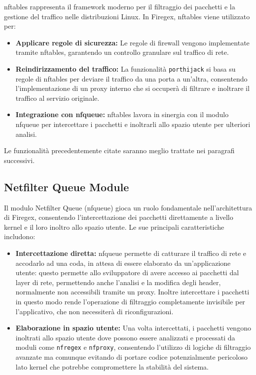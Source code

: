 nftables rappresenta il framework moderno per il filtraggio dei pacchetti e la gestione del traffico nelle distribuzioni Linux. In Firegex, nftables viene utilizzato per:
\begin{itemize}
    \item \textbf{Applicare regole di sicurezza:} Le regole di firewall vengono implementate tramite nftables, garantendo un controllo granulare sul traffico di rete.
    \item \textbf{Reindirizzamento del traffico:} La funzionalità \texttt{porthijack} si basa su regole di nftables per deviare il traffico da una porta a un’altra, consentendo l’implementazione di un proxy interno che si occuperà di filtrare e inoltrare il traffico al servizio originale.
    \item \textbf{Integrazione con nfqueue:} nftables lavora in sinergia con il modulo nfqueue per intercettare i pacchetti e inoltrarli allo spazio utente per ulteriori analisi.
\end{itemize}

Le funzionalità precedentemente citate saranno meglio trattate nei paragrafi successivi.

\subsection{Netfilter Queue Module}
Il modulo Netfilter Queue (nfqueue) gioca un ruolo fondamentale nell'architettura di Firegex, consentendo l'intercettazione dei pacchetti direttamente a livello kernel e il loro inoltro allo spazio utente. Le sue principali caratteristiche includono:
\begin{itemize}
    \setlength{\itemsep}{1pt}
    \setlength{\parskip}{1pt}
    \item \textbf{Intercettazione diretta:} nfqueue permette di catturare il traffico di rete e accodarlo ad una coda, in attesa di essere elaborato da un'applicazione utente: questo permette allo sviluppatore di avere accesso ai pacchetti dal layer di rete, permettendo anche l'analisi e la modifica degli header, normalmente non accessibili tramite un proxy. Inoltre intercettare i pacchetti in questo modo rende l'operazione di filtraggio completamente invisibile per l'applicativo, che non necessiterà di riconfigurazioni.
    \item \textbf{Elaborazione in spazio utente:} Una volta intercettati, i pacchetti vengono inoltrati allo spazio utente dove possono essere analizzati e processati da moduli come \texttt{nfregex} e \texttt{nfproxy}, consentendo l'utilizzo di logiche di filtraggio avanzate ma comunque evitando di portare codice potenzialmente pericoloso lato kernel che potrebbe compromettere la stabilità del sistema.
\end{itemize}

